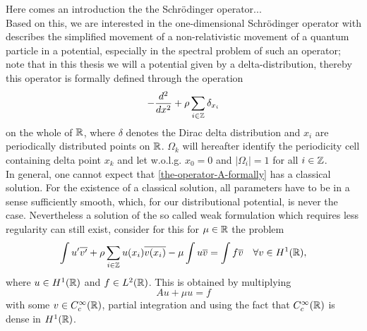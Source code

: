 Here comes an introduction the the Schrödinger operator... \\
Based on this, we are interested in the one-dimensional Schrödinger operator with describes the simplified movement of a non-relativistic movement of a quantum particle in a potential, especially in the spectral problem of such an operator; note that in this thesis we will a potential given by a delta-distribution, thereby this operator is formally defined through the operation
\begin{equation}
	- \frac{d^{2}}{dx^{2}} + \rho \sum_{i \in \mathbb{Z}} \delta_{x_{i}} \label{the-operator-A-formally}
\end{equation}
on the whole of $\mathbb{R}$, where $\delta$ denotes the Dirac delta distribution and $x_{i}$ are periodically distributed points on $\mathbb{R}$. $\Omega_{k}$ will hereafter identify the periodicity cell containing delta point $x_{k}$ and let w.o.l.g. $x_{0} = 0$ and $|\Omega_{i}| = 1$ for all $i \in \mathbb{Z}$. \\

In general, one cannot expect that \eqref{the-operator-A-formally} has a classical
solution. For the existence of a classical solution, all parameters have to be in a sense sufficiently smooth, which, for our distributional potential, is never the case. Nevertheless a solution of the so called weak formulation which requires less regularity can still exist, consider for this for $\mu \in \mathbb{R}$ the problem
\begin{equation}
	\int u' \overline{v'} + \rho \sum_{i \in \mathbb{Z}} u(x_{i}) \overline{v(x_{i})} - \mu \int u \overline{v} = \int f \overline{v} \quad \forall v \in H^{1}(\mathbb{R}), \label{weak-formulation-of-A}
\end{equation}	
where $u \in H^{1}(\mathbb{R})$ and $f \in L^{2}(\mathbb{R})$. This is obtained by multiplying
	\[ Au + \mu u = f \]
with some $v \in C_{c}^{\infty}(\mathbb{R})$, partial integration and using the fact that $C_{c}^{\infty}(\mathbb{R})$ is dense in $H^{1}(\mathbb{R})$. \\
	
